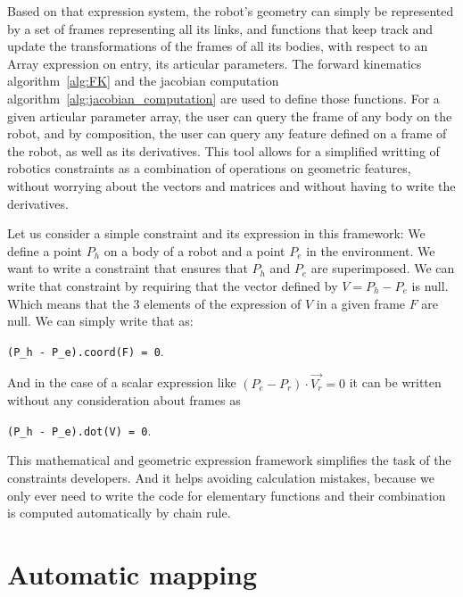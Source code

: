 Based on that expression system, the robot's geometry can simply be represented by a set of frames representing all its links, and functions that keep track and update the transformations of the frames of all its bodies, with respect to an Array expression on entry, its articular parameters.
The forward kinematics algorithm~\ref{alg:FK} and the jacobian computation algorithm~\ref{alg:jacobian_computation} are used to define those functions.
For a given articular parameter array, the user can query the frame of any body on the robot, and by composition, the user can query any feature defined on a frame of the robot, as well as its derivatives.
This tool allows for a simplified writting of robotics constraints as a combination of operations on geometric features, without worrying about the vectors and matrices and without having to write the derivatives.

Let us consider a simple constraint and its expression in this framework:
We define a point $P_h$ on a body of a robot and a point $P_e$ in the environment.
We want to write a constraint that ensures that $P_h$ and $P_e$ are superimposed.
We can write that constraint by requiring that the vector defined by $V = P_h - P_e$ is null.
Which means that the 3 elements of the expression of $V$ in a given frame $F$ are null.
We can simply write that as:
\begin{center}
{\tt(P\_h - P\_e).coord(F) = 0}.
\end{center}
And in the case of a scalar expression like $(P_e - P_r)\cdot \overrightarrow{V_r} = 0$ it can be written without any consideration about frames as
\begin{center}
{\tt(P\_h - P\_e).dot(V) = 0}.
\end{center}

This mathematical and geometric expression framework simplifies the task of the constraints developers.
And it helps avoiding calculation mistakes, because we only ever need to write the code for elementary functions and their combination is computed automatically by chain rule.



\section{Automatic mapping}
\label{sec:automatic_mapping}

